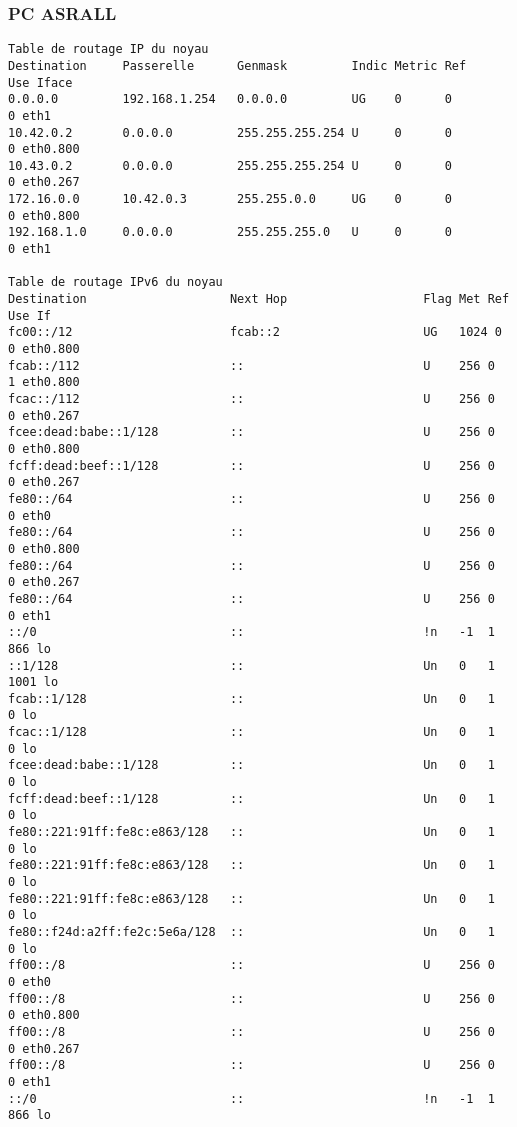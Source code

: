 \newpage

			\subsubsection{PC ASRALL}
			\vspace{0.3cm}

\begin{verbatim}
Table de routage IP du noyau
Destination     Passerelle      Genmask         Indic Metric Ref    Use Iface
0.0.0.0         192.168.1.254   0.0.0.0         UG    0      0        0 eth1
10.42.0.2       0.0.0.0         255.255.255.254 U     0      0        0 eth0.800
10.43.0.2       0.0.0.0         255.255.255.254 U     0      0        0 eth0.267
172.16.0.0      10.42.0.3       255.255.0.0     UG    0      0        0 eth0.800
192.168.1.0     0.0.0.0         255.255.255.0   U     0      0        0 eth1

Table de routage IPv6 du noyau
Destination                    Next Hop                   Flag Met Ref Use If
fc00::/12                      fcab::2                    UG   1024 0     0 eth0.800
fcab::/112                     ::                         U    256 0     1 eth0.800
fcac::/112                     ::                         U    256 0     0 eth0.267
fcee:dead:babe::1/128          ::                         U    256 0     0 eth0.800
fcff:dead:beef::1/128          ::                         U    256 0     0 eth0.267
fe80::/64                      ::                         U    256 0     0 eth0
fe80::/64                      ::                         U    256 0     0 eth0.800
fe80::/64                      ::                         U    256 0     0 eth0.267
fe80::/64                      ::                         U    256 0     0 eth1
::/0                           ::                         !n   -1  1   866 lo
::1/128                        ::                         Un   0   1  1001 lo
fcab::1/128                    ::                         Un   0   1     0 lo
fcac::1/128                    ::                         Un   0   1     0 lo
fcee:dead:babe::1/128          ::                         Un   0   1     0 lo
fcff:dead:beef::1/128          ::                         Un   0   1     0 lo
fe80::221:91ff:fe8c:e863/128   ::                         Un   0   1     0 lo
fe80::221:91ff:fe8c:e863/128   ::                         Un   0   1     0 lo
fe80::221:91ff:fe8c:e863/128   ::                         Un   0   1     0 lo
fe80::f24d:a2ff:fe2c:5e6a/128  ::                         Un   0   1     0 lo
ff00::/8                       ::                         U    256 0     0 eth0
ff00::/8                       ::                         U    256 0     0 eth0.800
ff00::/8                       ::                         U    256 0     0 eth0.267
ff00::/8                       ::                         U    256 0     0 eth1
::/0                           ::                         !n   -1  1   866 lo
\end{verbatim}

